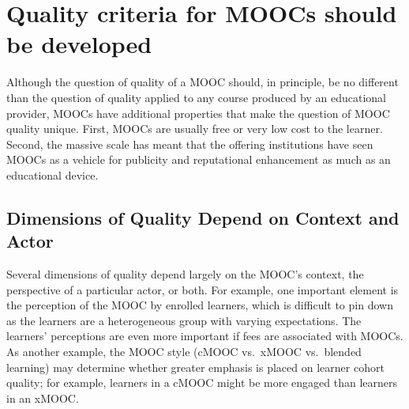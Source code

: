 \section{Quality criteria for MOOCs should be developed}


Although the question of quality of a MOOC should, in principle, be no
different than the question of quality applied to any course produced by
an educational provider, MOOCs have additional properties that make the
question of MOOC quality unique. First, MOOCs are usually free or very
low cost to the learner. Second, the massive scale has meant that the
offering institutions have seen MOOCs as a vehicle for publicity and
reputational enhancement as much as an educational device.



\subsection{Dimensions of Quality Depend on Context and Actor}

Several dimensions of quality depend largely on the
MOOC's context, the perspective of a particular actor, or both.
For example, one important element is the perception of the MOOC by
enrolled learners,
which is difficult to pin down as the learners are a heterogeneous group
with varying expectations. 
The learners' perceptions are even more important 
if fees are associated with MOOCs.  
As another example, the MOOC style (cMOOC vs.\ xMOOC vs.\
blended learning) may determine whether greater emphasis is placed on
learner cohort quality; for example, learners in a
cMOOC might be more engaged than learners in an xMOOC.

